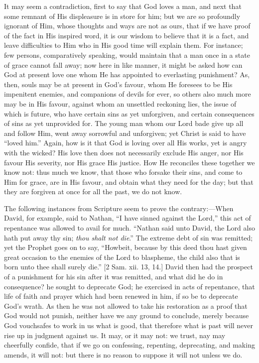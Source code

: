It may seem a contradiction, first to say that God loves a man, and
next that some remnant of His displeasure is in store for him; but we
are so profoundly ignorant of Him, whose thoughts and ways are not as
ours, that if we have proof of the fact in His inspired word, it is
our wisdom to believe that it is a fact, and leave difficulties to Him
who in His good time will explain them. For instance; few persons,
comparatively speaking, would maintain that a man once in a state of
grace cannot fall away; now here in like manner, it might be asked how
can God at present love one whom He has appointed to everlasting
punishment? As, then, souls may be at present in God's favour, whom He
foresees to be His impenitent enemies, and companions of devils for
ever, so others also much more may be in His favour, against whom an
unsettled reckoning lies, the issue of which is future, who have
certain sins as yet unforgiven, and certain consequences of sins as
yet unprovided for. The young man whom our Lord bade give up all and
follow Him, went away sorrowful and unforgiven; yet Christ is said to
have ``loved him.'' Again, how is it that God is loving over
all His works, yet is angry with the wicked? His love then does not
necessarily exclude His anger, nor His favour His severity, nor His
grace His justice. How He reconciles these together we know not: thus
much we know, that those who forsake their sins, and come to Him for
grace, are in His favour, and obtain what they need for the day; but
that they are forgiven at once for all the past, we do not know.

The following instances from Scripture seem to prove the contrary:—When
David, for example, said to Nathan, ``I have sinned against the
Lord,'' this act of repentance was allowed to avail for much.
``Nathan said unto David, the Lord also hath put away thy sin; \emph{thou
shalt not die}.'' The extreme debt of sin was remitted; yet the
Prophet goes on to say, ``Howbeit, because by this deed thou hast
given great occasion to the enemies of the Lord to blaspheme, the
child also that is born unto thee shall surely die.'' [2 Sam. xii.
13, 14.] David then had the prospect of a punishment for his sin after
it was remitted, and what did he do in consequence? he sought to
deprecate God; he exercised in acts of repentance, that life of faith
and prayer which had been renewed in him, if so be to deprecate God's
wrath. As then he was not allowed to take his restoration as a proof
that God would not punish, neither have we any ground to conclude,
merely because God vouchsafes to work in us what is good, that
therefore what is past will never rise up in judgment against us. It
may, or it may not: we trust, nay may cheerfully confide, that if we
go on confessing, repenting, deprecating, and making amends, it will
not: but there is no reason to suppose it will not unless we do.

